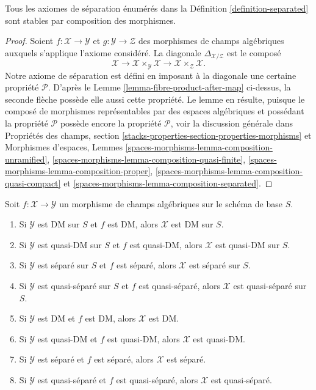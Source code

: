 \begin{lemma}
\label{lemma-composition-separated}
Tous les axiomes de séparation énumérés dans la Définition
\ref{definition-separated} sont stables par composition des morphismes.
\end{lemma}

\begin{proof}
Soient $f : \mathcal{X} \to \mathcal{Y}$ et
$g : \mathcal{Y} \to \mathcal{Z}$ des morphismes de champs algébriques
auxquels s'applique l'axiome considéré. La diagonale
$\Delta_{\mathcal{X}/\mathcal{Z}}$ est le composé
$$
\mathcal{X} \longrightarrow
\mathcal{X} \times_\mathcal{Y} \mathcal{X} \longrightarrow
\mathcal{X} \times_\mathcal{Z} \mathcal{X}.
$$
Notre axiome de séparation est défini en imposant à la diagonale une certaine
propriété $\mathcal{P}$. D'après le Lemme
\ref{lemma-fibre-product-after-map} ci-dessus, la seconde flèche possède elle
aussi cette propriété. Le lemme en résulte, puisque le composé de morphismes
représentables par des espaces algébriques et possédant la propriété
$\mathcal{P}$ possède encore la propriété $\mathcal{P}$, voir la discussion
générale dans Propriétés des champs,
section \ref{stacks-properties-section-properties-morphisms}
et Morphismes d'espaces, Lemmes
\ref{spaces-morphisms-lemma-composition-unramified},
\ref{spaces-morphisms-lemma-composition-quasi-finite},
\ref{spaces-morphisms-lemma-composition-proper},
\ref{spaces-morphisms-lemma-composition-quasi-compact} et
\ref{spaces-morphisms-lemma-composition-separated}.
\end{proof}

\begin{lemma}
\label{lemma-separated-over-separated}
Soit $f : \mathcal{X} \to \mathcal{Y}$ un morphisme de champs algébriques
sur le schéma de base $S$.
\begin{enumerate}
\item Si $\mathcal{Y}$ est DM sur $S$ et $f$ est DM, alors $\mathcal{X}$ est
DM sur $S$.
\item Si $\mathcal{Y}$ est quasi-DM sur $S$ et $f$ est quasi-DM, alors
$\mathcal{X}$ est quasi-DM sur $S$.
\item Si $\mathcal{Y}$ est séparé sur $S$ et $f$ est séparé, alors
$\mathcal{X}$ est séparé sur $S$.
\item Si $\mathcal{Y}$ est quasi-séparé sur $S$ et $f$ est quasi-séparé,
alors $\mathcal{X}$ est quasi-séparé sur $S$.
\item Si $\mathcal{Y}$ est DM et $f$ est DM, alors $\mathcal{X}$ est DM.
\item Si $\mathcal{Y}$ est quasi-DM et $f$ est quasi-DM, alors $\mathcal{X}$
est quasi-DM.
\item Si $\mathcal{Y}$ est séparé et $f$ est séparé, alors $\mathcal{X}$ est
séparé.
\item Si $\mathcal{Y}$ est quasi-séparé et $f$ est quasi-séparé, alors
$\mathcal{X}$ est quasi-séparé.
\end{enumerate}
\end{lemma}

